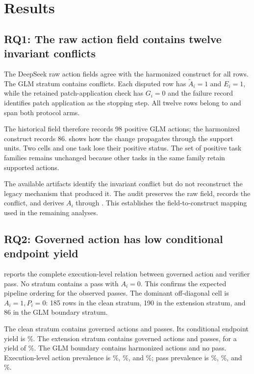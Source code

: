 \section{Results}
\label{sec:results}

\subsection{RQ1: The raw action field contains twelve invariant conflicts}

The DeepSeek raw action fields agree with the harmonized construct for all rows. The GLM stratum contains \ContradictionRows{} conflicts. Each disputed row has $\widetilde A_i=1$ and $E_i=1$, while the retained patch-application check has $G_i=0$ and the failure record identifies patch application as the stopping step. All twelve rows belong to  and span both protocol arms.

The historical field therefore records 98 positive GLM actions; the harmonized construct records 86.  shows how the change propagates through the support units. Two cells and one task lose their positive status. The set of positive task families remains unchanged because other tasks in the same family retain supported actions.



The available artifacts identify the invariant conflict but do not reconstruct the legacy mechanism that produced it. The audit preserves the raw field, records the conflict, and derives $A_i$ through . This establishes the field-to-construct mapping used in the remaining analyses.

\subsection{RQ2: Governed action has low conditional endpoint yield}

 reports the complete execution-level relation between governed action and verifier pass. No stratum contains a pass with $A_i=0$. This confirms the expected pipeline ordering for the observed passes. The dominant off-diagonal cell is $A_i=1,P_i=0$: 185 rows in the clean stratum, 190 in the extension stratum, and 86 in the GLM boundary stratum.

The clean stratum contains \CleanActions{} governed actions and \CleanPasses{} passes. Its conditional endpoint yield is \CleanYield\%. The extension stratum contains \ExtensionActions{} governed actions and \ExtensionPasses{} passes, for a yield of \ExtensionYield\%. The GLM boundary contains \GLMActions{} harmonized actions and no pass. Execution-level action prevalence is \CleanActionRate\%, \ExtensionActionRate\%, and \GLMActionRate\%; pass prevalence is \CleanPassRate\%, \ExtensionPassRate\%, and \GLMPassRate\%.

